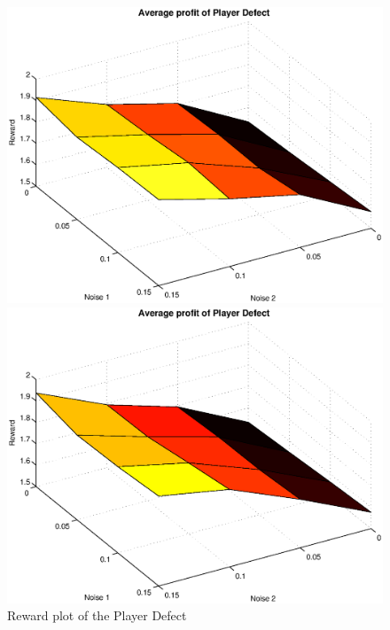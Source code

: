 \begin{figure}[h]

\begin{minipage}[hbt]{0.65\textwidth}
	\centering
	\includegraphics[width=\textwidth]{pics/simulation1/Reward_vs_Noise_of_Player_Defect}
\end{minipage}
\hfill
\begin{minipage}[hbt]{0.3\textwidth}
	\centering
	\includegraphics[width=\textwidth]{pics/simulation2/Reward_vs_Noise_of_Player_Defect}
\end{minipage}
	\caption{Reward plot of the Player Defect}
	\label{pic player defect}
\end{figure}

